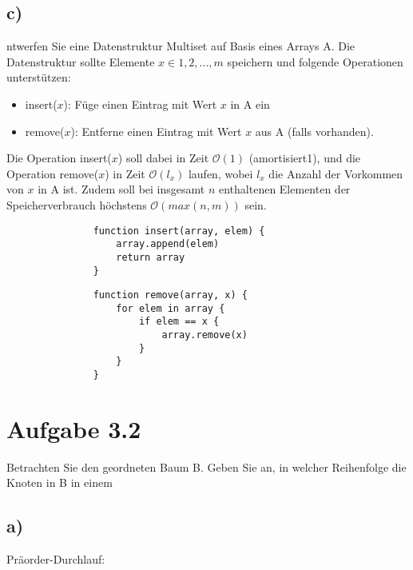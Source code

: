 \documentclass[a4paper]{article}
\begin{document}
\subsection*{c)}
ntwerfen Sie eine Datenstruktur Multiset auf Basis eines Arrays A. Die Datenstruktur sollte
Elemente $x \in {1, 2, . . . , m}$ speichern und folgende Operationen unterstützen:

\begin{itemize}
    \item insert($x$): Füge einen Eintrag mit Wert $x$ in A ein
    \item remove($x$): Entferne einen Eintrag mit Wert $x$ aus A (falls vorhanden).
\end{itemize}

Die Operation insert($x$) soll dabei in Zeit $\mathcal{O}(1)$ (amortisiert1), und die Operation remove($x$) in
Zeit $\mathcal{O}(l_x)$ laufen, wobei $l_x$ die Anzahl der Vorkommen von $x$ in A ist. Zudem soll bei insgesamt $n$ enthaltenen Elementen der Speicherverbrauch höchstens $\mathcal{O}(max(n, m))$ sein.

\begin{figure}[H]  %
  \begin{subfigure}[b]{0.4\textwidth}
    \begin{verbatim}
    function insert(array, elem) {
        array.append(elem)
        return array
    }
\end{verbatim}
  \end{subfigure}
  \hfill
  \begin{subfigure}[b]{0.4\textwidth}
  \begin{verbatim}
    function remove(array, x) {
        for elem in array {
            if elem == x {
                array.remove(x)
            }
        }
    }
\end{verbatim}
  \end{subfigure}
\end{figure}

\break


\section*{Aufgabe 3.2}

Betrachten Sie den geordneten Baum B.
Geben Sie an, in welcher Reihenfolge die Knoten in B in einem

\subsection*{a)}
Präorder-Durchlauf:
\end{document}
